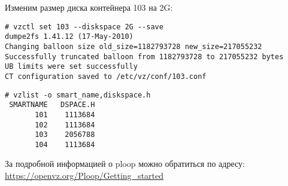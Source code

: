 Изменим размер диска контейнера 103 на 2G:
\begin{lstlisting}
# vzctl set 103 --diskspace 2G --save
dumpe2fs 1.41.12 (17-May-2010)
Changing balloon size old_size=1182793728 new_size=217055232
Successfully truncated balloon from 1182793728 to 217055232 bytes
UB limits were set successfully
CT configuration saved to /etc/vz/conf/103.conf
\end{lstlisting}
\begin{lstlisting}
# vzlist -o smart_name,diskspace.h
 SMARTNAME   DSPACE.H
       101    1113684
       102    1113684
       103    2056788
       104    1113684
\end{lstlisting} 

За подробной информацией о ploop можно обратиться по адресу: \url{https://openvz.org/Ploop/Getting_started}

\clearpage

